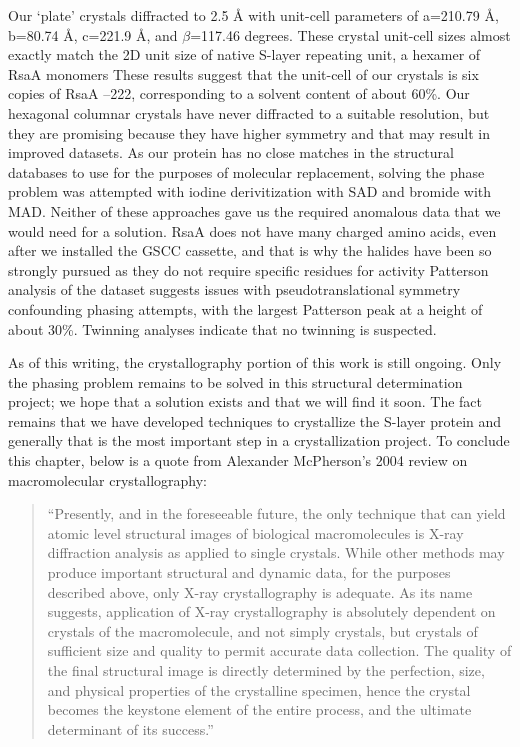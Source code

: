 Our `plate' crystals diffracted to 2.5 \AA{} with unit-cell parameters of
a=210.79 \AA, b=80.74 \AA, c=221.9 \AA,  and $\beta$=117.46 degrees. These
crystal unit-cell sizes almost exactly match the 2D unit size of native
\ac{S-layer} repeating unit, a hexamer of RsaA monomers
These results suggest that the unit-cell of our crystals is six copies of RsaA
--222, corresponding to a solvent content of  about 60\%. Our hexagonal
columnar crystals have never diffracted to a suitable resolution, but they are
promising because they have higher symmetry and that may result in improved
datasets. As our protein has no close matches in the structural databases to use
for the purposes of molecular replacement, solving the phase problem was
attempted with iodine derivitization with \ac{SAD} and bromide with \ac{MAD}.
Neither of these approaches gave us the required anomalous data that we would
need for a solution.   RsaA does not have many charged amino acids, even after
we installed the GSCC cassette, and that is why the halides have been so
strongly pursued as they do not require specific residues for
activity Patterson analysis of the dataset suggests issues with
pseudotranslational symmetry confounding phasing attempts, with the largest
Patterson peak at a height of about 30\%.  Twinning analyses indicate that no twinning is suspected.

As of this writing, the crystallography portion of this work is still ongoing.
Only the phasing problem remains to be solved in this structural determination
project; we hope that a solution exists and that we will find it soon. The fact remains that we have developed techniques to crystallize the \ac{S-layer} protein and generally that is the most important step in a crystallization project. To conclude this chapter, below is a quote from Alexander McPherson's 2004 review on macromolecular crystallography:

\begin{quote}
 ``Presently, and in the foreseeable future, the only technique that can yield atomic level structural images of biological macromolecules is X-ray diffraction analysis as applied to single crystals. While other methods may produce important structural and dynamic data, for the purposes described above, only X-ray crystallography is adequate. As its name suggests, application of X-ray crystallography is absolutely dependent on crystals of the macromolecule, and not simply crystals, but crystals of sufficient size and quality to permit accurate data collection. The quality of the final structural image is directly determined by the perfection, size, and physical properties of the crystalline specimen, hence the crystal becomes the keystone element of the entire process, and the ultimate determinant of its success.''
\end{quote}